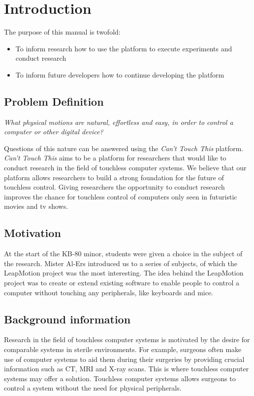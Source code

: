 \documentclass{standalone}
\begin{document}
  \section{Introduction}
  The purpose of this manual is twofold:
  \begin{itemize}
    \tightlist{}
    \item To inform research how to use the platform to execute experiments and
      conduct research
    \item To inform future developers how to continue developing the platform
  \end{itemize}

  \subsection{Problem Definition}
  \textit{What physical motions are natural, effortless and easy, in order to
    control a computer or other digital device?}

  Questions of this nature can be answered using the \textit{Can't Touch This}
  platform. \textit{Can't Touch This} aims to be a platform for researchers that
  would like to conduct research in the field of touchless computer systems. We
  believe that our platform allows researchers to build a strong foundation for
  the future of touchless control. Giving researchers the opportunity to conduct
  research improves the chance for touchless control of computers only seen in
  futuristic movies and tv shows.

  \subsection{Motivation}
  At the start of the KB-80 minor, students were given a choice in the subject
  of the research. Mister Al-Ers introduced us to a series of subjects, of which
  the LeapMotion project was the most interesting. The idea behind the
  LeapMotion project was to create or extend existing software to enable people
  to control a computer without touching any peripherals, like keyboards and
  mice.

  \subsection{Background information}
  Research in the field of touchless computer systems is motivated by the desire
  for comparable systems in sterile environments. For example, surgeons often
  make use of computer systems to aid them during their surgeries by providing
  crucial information such as CT, MRI and X-ray scans. This is where touchless
  computer systems may offer a solution. Touchless computer systems allows
  surgeons to control a system without the need for physical peripherals.
  \clearpage
\end{document}
